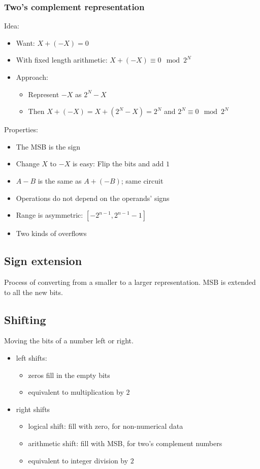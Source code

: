 \documentclass{article}
\theoremstyle{sltheorem}
\begin{document}
\subsubsection{Two's complement representation}
Idea:
\begin{itemize}
	\item Want: $X + (-X) = 0$
	\item With fixed length arithmetic: $X + (-X) \equiv 0 \mod 2^N$
	\item Approach:
	\begin{itemize}
		\item Represent $-X$ as $2^N-X$
		\item Then $X + (-X) = X + (2^N - X) = 2^N$ and $2^N \equiv 0 \mod 2^N$
	\end{itemize}
\end{itemize}
Properties:
\begin{itemize}
	\item The MSB is the sign
	\item Change $X$ to $-X$ is easy: Flip the bits and add $1$
	\item $A-B$ is the same as $A+(-B)$; same circuit
	\item Operations do not depend on the operands' signs
	\item Range is asymmetric: $[-2^{n-1}, 2^{n-1}-1]$
	\item Two kinds of overflows 
\end{itemize}
\subsection{Sign extension}
Process of converting from a smaller to a larger representation.
MSB is extended to all the new bits.
\subsection{Shifting}
Moving the bits of a number left or right.
\begin{itemize}
	\item left shifts: \begin{itemize}
		\item zeros fill in the empty bits
		\item equivalent to multiplication by $2$
	\end{itemize}
	\item right shifts \begin{itemize}
		\item logical shift: fill with zero, for non-numerical data
		\item arithmetic shift: fill with MSB, for two's complement numbers
		\item equivalent to integer division by $2$
	\end{itemize}
\end{itemize}
\end{document}

